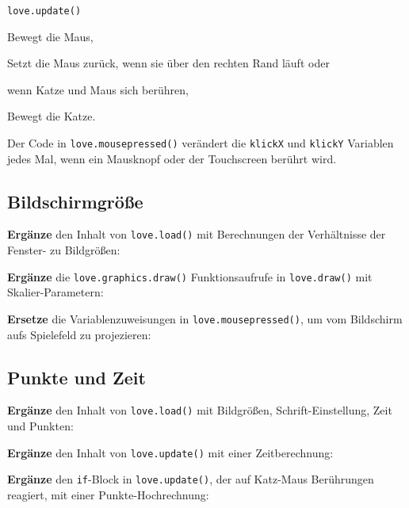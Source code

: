 \documentclass[a4paper, 11pt]{article}
\begin{document}
\texttt{love.update()}
\begin{enumerate*}
  \item Bewegt die Maus,
  \item Setzt die Maus zurück, wenn sie über den rechten Rand läuft oder
  \item wenn Katze und Maus sich berühren,
  \item Bewegt die Katze.
\end{enumerate*}

Der Code in \texttt{love.mousepressed()} verändert die \texttt{klickX} und \texttt{klickY} Variablen jedes Mal, wenn ein Mausknopf oder der Touchscreen berührt wird.

\newpage

\subsection{Bildschirmgröße}

\textbf{Ergänze} den Inhalt von \texttt{love.load()} mit Berechnungen der Verhältnisse der Fenster- zu Bildgrößen:



\textbf{Ergänze} die \texttt{love.graphics.draw()} Funktionsaufrufe in \texttt{love.draw()} mit Skalier-Parametern:



\textbf{Ersetze} die Variablenzuweisungen in \texttt{love.mousepressed()}, um vom Bildschirm aufs Spielefeld zu projezieren:



\subsection{Punkte und Zeit}

\textbf{Ergänze} den Inhalt von \texttt{love.load()} mit Bildgrößen, Schrift-Einstellung, Zeit und Punkten:



\textbf{Ergänze} den Inhalt von \texttt{love.update()} mit einer Zeitberechnung:



\textbf{Ergänze} den \texttt{if}-Block in \texttt{love.update()}, der auf Katz-Maus Berührungen reagiert, mit einer Punkte-Hochrechnung:


\end{document}
